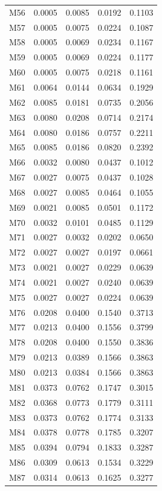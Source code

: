 \begin{longtable}{lrrrr}
M56 & 0.0005 & 0.0085 & 0.0192 & 0.1103 \\
M57 & 0.0005 & 0.0075 & 0.0224 & 0.1087 \\
M58 & 0.0005 & 0.0069 & 0.0234 & 0.1167 \\
M59 & 0.0005 & 0.0069 & 0.0224 & 0.1177 \\
M60 & 0.0005 & 0.0075 & 0.0218 & 0.1161 \\
M61 & 0.0064 & 0.0144 & 0.0634 & 0.1929 \\
M62 & 0.0085 & 0.0181 & 0.0735 & 0.2056 \\
M63 & 0.0080 & 0.0208 & 0.0714 & 0.2174 \\
M64 & 0.0080 & 0.0186 & 0.0757 & 0.2211 \\
M65 & 0.0085 & 0.0186 & 0.0820 & 0.2392 \\
M66 & 0.0032 & 0.0080 & 0.0437 & 0.1012 \\
M67 & 0.0027 & 0.0075 & 0.0437 & 0.1028 \\
M68 & 0.0027 & 0.0085 & 0.0464 & 0.1055 \\
M69 & 0.0021 & 0.0085 & 0.0501 & 0.1172 \\
M70 & 0.0032 & 0.0101 & 0.0485 & 0.1129 \\
M71 & 0.0027 & 0.0032 & 0.0202 & 0.0650 \\
M72 & 0.0027 & 0.0027 & 0.0197 & 0.0661 \\
M73 & 0.0021 & 0.0027 & 0.0229 & 0.0639 \\
M74 & 0.0021 & 0.0027 & 0.0240 & 0.0639 \\
M75 & 0.0027 & 0.0027 & 0.0224 & 0.0639 \\
M76 & 0.0208 & 0.0400 & 0.1540 & 0.3713 \\
M77 & 0.0213 & 0.0400 & 0.1556 & 0.3799 \\
M78 & 0.0208 & 0.0400 & 0.1550 & 0.3836 \\
M79 & 0.0213 & 0.0389 & 0.1566 & 0.3863 \\
M80 & 0.0213 & 0.0384 & 0.1566 & 0.3863 \\
M81 & 0.0373 & 0.0762 & 0.1747 & 0.3015 \\
M82 & 0.0368 & 0.0773 & 0.1779 & 0.3111 \\
M83 & 0.0373 & 0.0762 & 0.1774 & 0.3133 \\
M84 & 0.0378 & 0.0778 & 0.1785 & 0.3207 \\
M85 & 0.0394 & 0.0794 & 0.1833 & 0.3287 \\
M86 & 0.0309 & 0.0613 & 0.1534 & 0.3229 \\
M87 & 0.0314 & 0.0613 & 0.1625 & 0.3277 \\

\end{longtable}
